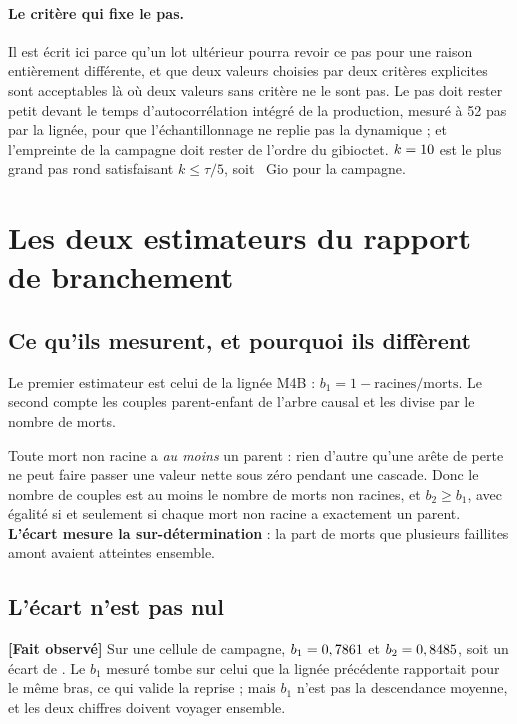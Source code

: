 \documentclass[11pt,a4paper]{article}
\newcommand{\fait}{\textbf{[Fait observé]}}
\begin{document}
\paragraph{Le critère qui fixe le pas.} Il est écrit ici parce qu'un lot
ultérieur pourra revoir ce pas pour une raison entièrement différente, et
que deux valeurs choisies par deux critères explicites sont acceptables là où
deux valeurs sans critère ne le sont pas. Le pas doit rester petit devant le
temps d'autocorrélation intégré de la production, mesuré à 52 pas par la
lignée, pour que l'échantillonnage ne replie pas la dynamique ; et
l'empreinte de la campagne doit rester de l'ordre du gibioctet.
$k = 10$ est le plus grand pas rond satisfaisant
$k \le \tau/5$, soit \EmpreinteCampagneGio~Gio pour la campagne.

\section{Les deux estimateurs du rapport de branchement}

\subsection{Ce qu'ils mesurent, et pourquoi ils diffèrent}

Le premier estimateur est celui de la lignée M4B : $b_1 = 1 -
\text{racines}/\text{morts}$. Le second compte les couples parent-enfant de
l'arbre causal et les divise par le nombre de morts.

Toute mort non racine a \emph{au moins} un parent : rien d'autre qu'une arête
de perte ne peut faire passer une valeur nette sous zéro pendant une cascade.
Donc le nombre de couples est au moins le nombre de morts non racines, et
$b_2 \ge b_1$, avec égalité si et seulement si chaque mort non racine a
exactement un parent. \textbf{L'écart mesure la sur-détermination} : la part
de morts que plusieurs faillites amont avaient atteintes ensemble.

\subsection{L'écart n'est pas nul}

\fait{} Sur une cellule de campagne, $b_1 = 0,7861$ et $b_2 = 0,8485$,
soit un écart de \LotAEcartB. Le $b_1$ mesuré tombe sur celui que la lignée
précédente rapportait pour le même bras, ce qui valide la reprise ; mais
$b_1$ n'est pas la descendance moyenne, et les deux chiffres doivent voyager
ensemble.
\end{document}
